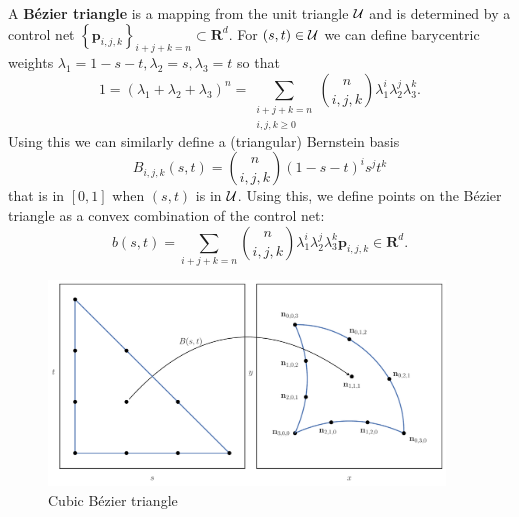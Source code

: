 A \textbf{B\'{e}zier triangle} is a mapping from the unit triangle
\(\mathcal{U}\) and is determined by a control net
\(\left\{\mathbf{p}_{i, j, k}\right\}_{i + j + k = n} \subset \mathbf{R}^d\).
For \((s, t) \in \mathcal{U}\) we can define barycentric weights
\(\lambda_1 = 1 - s - t, \lambda_2 = s, \lambda_3 = t\) so that
\begin{equation}
1 = \left(\lambda_1 + \lambda_2 + \lambda_3\right)^n =
  \sum_{\substack{i + j + k = n \\ i, j, k \geq 0}} \binom{n}{i, j, k}
  \lambda_1^i \lambda_2^j \lambda_3^k.
\end{equation}
Using this we can similarly define a (triangular) Bernstein basis
\begin{equation}
B_{i, j, k}(s, t) = \binom{n}{i, j, k} (1 - s - t)^i s^j t^k
\end{equation}
that is in \(\left[0, 1\right]\) when \((s, t)\) is in \(\mathcal{U}\).
Using this, we define points on the B\'{e}zier triangle as a
convex combination of the control net:
\begin{equation}
b(s, t) = \sum_{i + j + k = n} \binom{n}{i, j, k}
  \lambda_1^i \lambda_2^j \lambda_3^k
  \mathbf{p}_{i, j, k} \in \mathbf{R}^d.
\end{equation}

\begin{figure}
  \includegraphics[width=0.9375\textwidth]{../images/curved-mesh/main_figure01.pdf}
  \centering
  \caption{Cubic B\'{e}zier triangle}
  \label{fig:cubic-bezier-example}
\end{figure}

